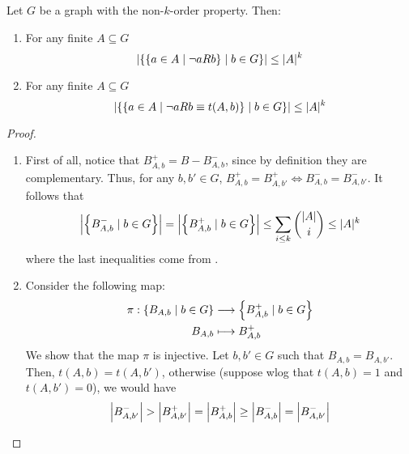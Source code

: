     \begin{corollary}[Claim 2.6.1] \label{cor:k_order_propery_bounds_BAbs}
        Let $G$ be a graph with the non-$k$-order property.
        Then:
        \begin{enumerate}
            \item\label{itm:k_order_propery_bounds_BAbs.1} For any finite $A \subseteq G$
                \[
                    \left| \left\{ \left\{ a \in A \mid \neg a R b \right\} \mid b \in G \right\} \right|
                        \leq |A|^k
                \]
            \item\label{itm:k_order_propery_bounds_BAbs.2} For any finite $A \subseteq G$
                \[
                    \left| \left\{ \left\{ a \in A \mid \neg a R b \equiv t(A,b) \right\} \mid b \in G \right\} \right|
                        \leq |A|^k
                \]
        \end{enumerate}
        \begin{proof}
        \begin{enumerate}
            \item First of all, notice that $B^+_{A,b} = B - B^-_{A,b}$, since by definition they are complementary.
                Thus, for any $b, b' \in G$, $B^+_{A,b} = B^+_{A,b'} \Leftrightarrow B^-_{A,b} = B^-_{A,b'}$.
                It follows that
                \[
                    \left| \left\{ B^-_{A,b} \mid b \in G \right\} \right| =
                    \left| \left\{ B^+_{A,b} \mid b \in G \right\} \right| \leq
                    \sum_{i \leq k} \binom{|A|}{i} \leq |A|^k
                \]
                where the last inequalities come from .
            \item Consider the following map:
                \begin{align*}
                    \pi: \left\{ B_{A,b} \mid b \in G \right\} & \longrightarrow \left\{ B^+_{A,b} \mid b \in G \right\} \\
                                                       B_{A,b} & \longmapsto B^+_{A,b}
                \end{align*}
                We show that the map $\pi$ is injective.
                Let $b,b' \in G$ such that $B_{A,b} = B_{A,b'}$.
                Then, $t(A,b) = t(A,b')$, otherwise (suppose wlog that $t(A,b) = 1$ and $t(A,b') = 0$), we would have
                \[
                    \left| B^-_{A,b'} \right| > \left| B^+_{A,b'} \right| = \left| B^+_{A,b} \right| \geq
                        \left| B^-_{A,b} \right| = \left| B^-_{A,b'} \right|
                \]

\end{enumerate}
\end{proof}
\end{corollary}
